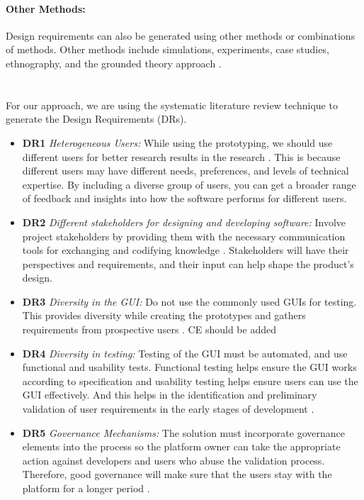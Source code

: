 \paragraph*{Other Methods:}
Design requirements can also be generated using other methods or combinations of methods.
Other methods include simulations, experiments, case studies, ethnography, and the grounded theory approach \cite{misc:dsr:nickerson, misc:dsr:varshney}. \\ \\\\
\clearpage
For our approach, we are using the systematic literature review technique to generate the Design Requirements (DRs).
\begin{itemize}
  \item \textbf{DR1} \textit{Heterogeneous Users:} While using the prototyping, we should use different users for better research results in the research \cite{article:prototyping:weichbroth,misc:lean:steve, misc:lean:burmeister}. This is because different users may have different needs, preferences, and levels of technical expertise. By including a diverse group of users, you can get a broader range of feedback and insights into how the software performs for different users.
  \item \textbf{DR2} \textit{Different stakeholders for designing and developing software:} Involve project stakeholders by providing them with the necessary communication tools for exchanging and codifying knowledge \cite{article:prototyping:weichbroth, misc:prorotypes:lauff}. Stakeholders will have their perspectives and requirements, and their input can help shape the product's design.
  \item \textbf{DR3} \textit{Diversity in the GUI:} Do not use the commonly used GUIs for testing. This provides diversity while creating the prototypes and gathers requirements from prospective users \cite{article:prototyping:weichbroth}. CE should be added
  \item \textbf{DR4} \textit{Diversity in testing:} Testing of the GUI must be automated, and use functional and usability tests. Functional testing helps ensure the GUI works according to specification and usability testing helps ensure users can use the GUI effectively. And this helps in the identification and preliminary validation of user requirements in the early stages of development \cite{article:prototyping:weichbroth}.
  \item \textbf{DR5} \textit{Governance Mechanisms:} The solution must incorporate governance elements into the process so the platform owner can take the appropriate action against developers and users who abuse the validation process. Therefore, good governance will make sure that the users stay with the platform for a longer period \cite{misc:prototypes:evans,misc:dps:parker}. 

\end{itemize}
